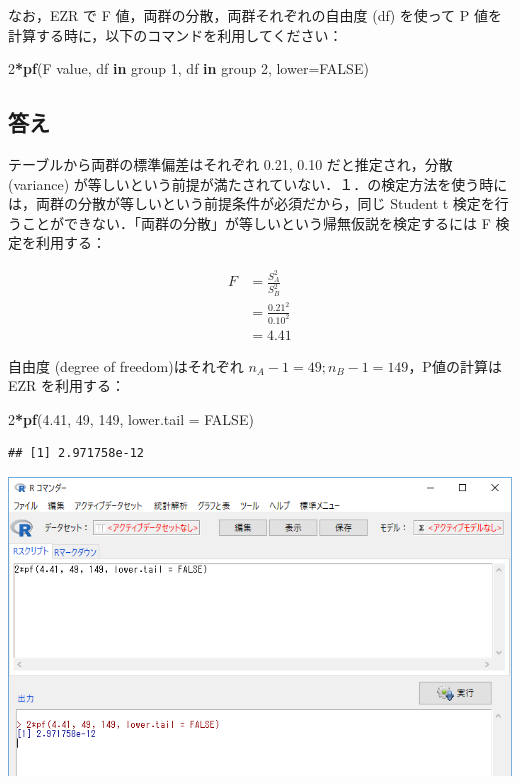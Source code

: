 \documentclass[]{problemset}
\newenvironment{Shaded}{\begin{snugshade}}{\end{snugshade}}
\newcommand{\ControlFlowTok}[1]{\textcolor[rgb]{0.13,0.29,0.53}{\textbf{#1}}}
\newcommand{\DataTypeTok}[1]{\textcolor[rgb]{0.13,0.29,0.53}{#1}}
\newcommand{\DecValTok}[1]{\textcolor[rgb]{0.00,0.00,0.81}{#1}}
\newcommand{\FloatTok}[1]{\textcolor[rgb]{0.00,0.00,0.81}{#1}}
\newcommand{\KeywordTok}[1]{\textcolor[rgb]{0.13,0.29,0.53}{\textbf{#1}}}
\newcommand{\NormalTok}[1]{#1}
\newcommand{\OperatorTok}[1]{\textcolor[rgb]{0.81,0.36,0.00}{\textbf{#1}}}
\newcommand{\OtherTok}[1]{\textcolor[rgb]{0.56,0.35,0.01}{#1}}
\begin{document}
なお，EZR で F 値，両群の分散，両群それぞれの自由度 (df) を使って P
値を計算する時に，以下のコマンドを利用してください：

\begin{Shaded}
\begin{Highlighting}[]
\DecValTok{2}\OperatorTok{*}\KeywordTok{pf}\NormalTok{(F value, df }\ControlFlowTok{in}\NormalTok{ group }\DecValTok{1}\NormalTok{, df }\ControlFlowTok{in}\NormalTok{ group }\DecValTok{2}\NormalTok{, }\DataTypeTok{lower=}\OtherTok{FALSE}\NormalTok{)}
\end{Highlighting}
\end{Shaded}

\hypertarget{-1}{%
\subsection{答え}\label{-1}}

テーブルから両群の標準偏差はそれぞれ 0.21, 0.10 だと推定され，分散
(variance)
が等しいという前提が満たされていない．１．の検定方法を使う時には，両群の分散が等しいという前提条件が必須だから，同じ
Student t
検定を行うことができない．「両群の分散」が等しいという帰無仮説を検定するには
F 検定を利用する：

\[
\begin{aligned}
F & = \frac{S^2_A}{S^2_B} \\
  & = \frac{0.21^2}{0.10^2} \\
  & = 4.41
\end{aligned}
\]

自由度 (degree of freedom)はそれぞれ
\(n_A - 1 = 49; n_B -1 = 149\)，P値の計算は EZR を利用する：

\begin{Shaded}
\begin{Highlighting}[]
\DecValTok{2}\OperatorTok{*}\KeywordTok{pf}\NormalTok{(}\FloatTok{4.41}\NormalTok{, }\DecValTok{49}\NormalTok{, }\DecValTok{149}\NormalTok{, }\DataTypeTok{lower.tail =} \OtherTok{FALSE}\NormalTok{)}
\end{Highlighting}
\end{Shaded}

\begin{verbatim}
## [1] 2.971758e-12
\end{verbatim}

\begin{center}\includegraphics[width=0.9\linewidth]{pic/ftest} \end{center}
\bigskip
\end{document}
